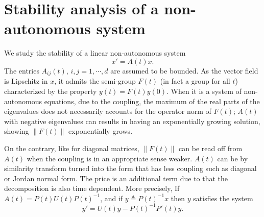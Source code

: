 \documentclass[a4paper,11pt]{article}
\theoremstyle{remark}
\begin{document}
\section{Stability analysis of a non-autonomous system}
We study the stability of a linear non-autonomous system
$$ x'=A(t) x.$$%
The entries $A_{ij}(t)$, $i,j=1,\cdots,d$ are assumed to be bounded. As the vector field is Lipschitz in $x$, it admits the semi-group $F(t)$ (in fact a group for all $t$) characterized by the property $y(t)=F(t)y(0)$. When it is a system of non-autonomous equations, due to the coupling, the maximum of the real parts of the eigenvalues does not necessarily accounts for the operator norm of $F(t)$; $A(t)$ with negative eigenvalues can results in having an exponentially growing solution, showing $\|F(t)\|$ exponentially grows.

On the contrary, like for diagonal matrices, $\|F(t)\|$ can be read off from $A(t)$ when the coupling is in an appropriate sense weaker. $A(t)$ can be by similarity transform turned into the form that has less coupling such as diagonal or Jordan normal form. The price is an additional term due to that the decomposition is also time dependent. More precisely, If $A(t) = P(t)U(t)P(t)^{-1}$, and if $y\triangleq P(t)^{-1}x$ then $y$ satisfies the system
\begin{equation} y' = U(t)y - P(t)^{-1}P'(t)y. \label{eq:after_fact} \end{equation}
\end{document}
